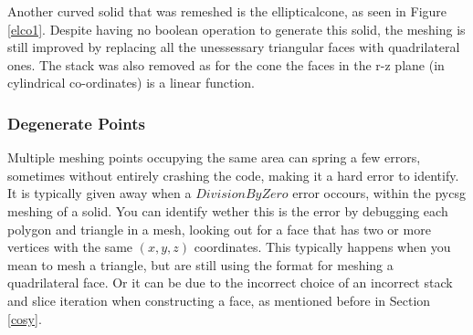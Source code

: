 \documentclass[12pt,a4paper]{article}
\begin{document}
\noindent Another curved solid that was remeshed is the ellipticalcone, as seen in Figure \ref{elco1}. Despite having no boolean operation to generate this solid, the meshing is still improved by replacing all the unessessary triangular faces with quadrilateral ones. The stack was also removed as for the cone the faces in the r-z plane (in cylindrical co-ordinates) is a linear function.

\subsubsection{Degenerate Points}
Multiple meshing points occupying the same area can spring a few errors, sometimes without entirely crashing the code, making it a hard error to identify. It is typically given away when a $DivisionByZero$ error occours, within the pycsg meshing of a solid. You can identify wether this is the error by debugging each polygon and triangle in a mesh, looking out for a face that has two or more vertices with the same $(x,y,z)$ coordinates. This typically happens when you mean to mesh a triangle, but are still using the format for meshing a quadrilateral face. Or it can be due to the incorrect choice of an incorrect stack and slice iteration when constructing a face, as mentioned before in Section \ref{cosy}.
\end{document}
